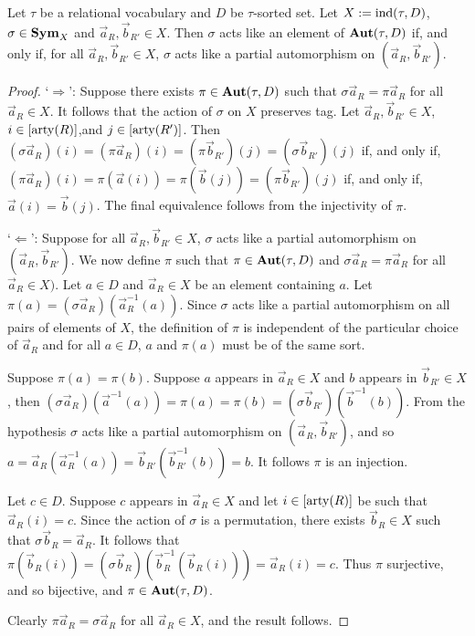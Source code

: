\documentclass[../paper.tex]{subfiles}
\begin{document}
\begin{lem}
  Let $\tau$ be a relational vocabulary and $D$ be $\tau$-sorted set. Let $X :=
  \text{\upshape ind}(\tau, D)$, $\sigma \in \text{\textbf{Sym}}_X$ and $\vec{a}_R, \vec{b}_{R'} \in X$. Then
  $\sigma$ acts like an element of $\text{\textbf{Aut}} (\tau, D)$ if, and only if, for all
  $\vec{a}_R, \vec{b}_{R'} \in X$, $\sigma$ acts like a partial automorphism on
  $(\vec{a}_R, \vec{b}_{R'})$.
  \label{lem:aut-partial}
\end{lem}
\begin{proof}
  `$\Rightarrow$': Suppose there exists $\pi \in \text{\textbf{Aut}}(\tau, D)$ such that
  $\sigma \vec{a}_R = \pi \vec{a}_R$ for all $\vec{a}_R \in X$. It follows that
  the action of $\sigma$ on $X$ preserves tag. Let $\vec{a}_R, \vec{b}_{R'} \in
  X$, $i \in [\mathrm{arty} (R)]$,and $j \in [\mathrm{arty} (R')]$. Then $(\sigma \vec{a}_R) (i)
  = (\pi \vec{a}_R)(i) = (\pi \vec{b}_{R'})(j) = (\sigma \vec{b}_{R'})(j)$ if,
  and only if, $(\pi \vec{a}_R)(i) = \pi (\vec{a}(i)) = \pi (\vec{b}(j)) =
  (\pi\vec{b}_{R'})(j)$ if, and only if, $\vec{a}(i) = \vec{b}(j)$. The final
  equivalence follows from the injectivity of $\pi$.
  
  `$\Leftarrow$': Suppose for all $\vec{a}_R, \vec{b}_{R'} \in X$, $\sigma$ acts
  like a partial automorphism on $(\vec{a}_R, \vec{b}_{R'})$. We now define
  $\pi$ such that $\pi \in \text{\textbf{Aut}}(\tau, D)$ and $\sigma \vec{a}_R = \pi \vec{a}_R$
  for all $\vec{a}_R \in X)$. Let $a \in D$ and $\vec{a}_R \in X$ be an element
  containing $a$. Let $\pi (a) = (\sigma \vec{a}_R) (\vec{a}^{-1}_R(a))$. Since
  $\sigma$ acts like a partial automorphism on all pairs of elements of $X$, the
  definition of $\pi$ is independent of the particular choice of $\vec{a}_R$ and
  for all $a \in D$, $a$ and $\pi (a)$ must be of the same sort.
  
  Suppose $\pi(a) = \pi(b)$. Suppose $a$ appears in $\vec{a}_R \in X$ and $b$
  appears in $\vec{b}_{R'} \in X$, then $(\sigma \vec{a}_R) (\vec{a}^{-1}(a)) =
  \pi (a) = \pi(b) = (\sigma \vec{b}_{R'})(\vec{b}^{-1}(b))$. From the
  hypothesis $\sigma$ acts like a partial automorphism on $(\vec{a}_R,
  \vec{b}_{R'})$, and so $a = \vec{a}_R(\vec{a}^{-1}_R(a)) =
  \vec{b}_{R'}(\vec{b}^{-1}_{R'}(b)) = b$. It follows $\pi$ is an injection.
  
  Let $c \in D$. Suppose $c$ appears in $\vec{a}_R \in X$ and let $i \in
  [\mathrm{arty}(R)]$ be such that $\vec{a}_R(i) = c$. Since the action of $\sigma$ is a
  permutation, there exists $\vec{b}_R \in X$ such that $\sigma \vec{b}_R =
  \vec{a}_R$. It follows that $\pi (\vec{b}_R(i)) = (\sigma \vec{b}_R)
  (\vec{b}^{-1}_R(\vec{b}_R(i))) = \vec{a}_R(i) = c$. Thus $\pi$ surjective, and
  so bijective, and $\pi \in \text{\textbf{Aut}}(\tau, D)$.

  Clearly $\pi \vec{a}_R = \sigma \vec{a}_R$ for all $\vec{a}_R \in X$, and the
  result follows.

\end{proof}
\end{document}
